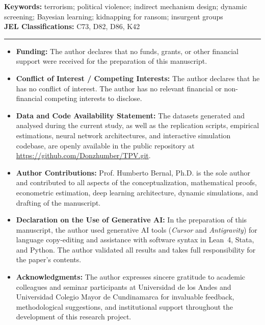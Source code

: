 \documentclass[11pt]{article}
\begin{document}
\vspace{0.25cm}

\noindent \textbf{Keywords:} terrorism; political violence; indirect mechanism design; dynamic screening; Bayesian learning; kidnapping for ransom; insurgent groups\\[0.25em]
\noindent \textbf{JEL Classifications:} C73, D82, D86, K42

\vspace{0.3cm}
\noindent\rule{\textwidth}{0.4pt}
\vspace{0.15cm}

\begin{itemize}\footnotesize
    \setlength{\itemsep}{0.2em}
    \item \textbf{Funding:} The author declares that no funds, grants, or other financial support were received for the preparation of this manuscript.
    \item \textbf{Conflict of Interest / Competing Interests:} The author declares that he has no conflict of interest. The author has no relevant financial or non-financial competing interests to disclose.
    \item \textbf{Data and Code Availability Statement:} The datasets generated and analysed during the current study, as well as the replication scripts, empirical estimations, neural network architectures, and interactive simulation codebase, are openly available in the public repository at \url{https://github.com/Donzhumber/TPV.git}.
    \item \textbf{Author Contributions:} Prof. Humberto Bernal, Ph.D. is the sole author and contributed to all aspects of the conceptualization, mathematical proofs, econometric estimation, deep learning architecture, dynamic simulations, and drafting of the manuscript.
    \item \textbf{Declaration on the Use of Generative AI:} In the preparation of this manuscript, the author used generative AI tools (\emph{Cursor} and \emph{Antigravity}) for language copy-editing and assistance with software syntax in Lean~4, Stata, and Python. The author validated all results and takes full responsibility for the paper's contents.
    \item \textbf{Acknowledgments:} The author expresses sincere gratitude to academic colleagues and seminar participants at Universidad de los Andes and Universidad Colegio Mayor de Cundinamarca for invaluable feedback, methodological suggestions, and institutional support throughout the development of this research project.
\end{itemize}
\end{document}
